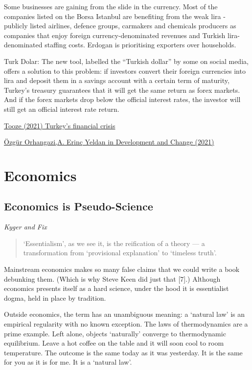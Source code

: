 \documentclass[
]{book}
\begin{document}
Some businesses are gaining from the slide in the currency. Most of the companies listed on the Borsa Istanbul are benefiting from the weak lira - publicly listed airlines, defence groups, carmakers and chemicals producers as companies that enjoy foreign currency-denominated revenues and Turkish lira-denominated staffing costs. Erdogan is prioritising exporters over households.

Turk Dolar: The new tool, labelled the ``Turkish dollar'' by some on social media, offers a solution to this problem: if investors convert their foreign currencies into lira and deposit them in a savings account with a certain term of maturity, Turkey's treasury guarantees that it will get the same return as forex markets. And if the forex markets drop below the official interest rates, the investor will still get an official interest rate return.

\href{https://adamtooze.substack.com/p/chartbook-63-turkeys-financial-crisis}{Tooze (2021) Turkey's financial crisis}

\href{https://onlinelibrary.wiley.com/doi/full/10.1111/dech.12644}{Özgür Orhangazi,A. Erinç Yeldan in Development and Change (2021)}

\hypertarget{economics-1}{%
\chapter{Economics}\label{economics-1}}

\hypertarget{economics-is-pseudo-science}{%
\section{Economics is Pseudo-Science}\label{economics-is-pseudo-science}}

\emph{Kyger and Fix}

\begin{quote}
`Essentialism', as we see it, is the reification of a theory --- a transformation from `provisional explanation' to `timeless truth'.
\end{quote}

Mainstream economics makes so many false claims that we could write a book debunking them. (Which is why Steve Keen did just that {[}7{]}.) Although economics presents itself as a hard science, under the hood it is essentialist dogma, held in place by tradition.

Outside economics, the term has an unambiguous meaning: a `natural law' is an empirical regularity with no known exception. The laws of thermodynamics are a prime example. Left alone, objects `naturally' converge to thermodynamic equilibrium. Leave a hot coffee on the table and it will soon cool to room temperature. The outcome is the same today as it was yesterday. It is the same for you as it is for me. It is a `natural law'.
\end{document}

